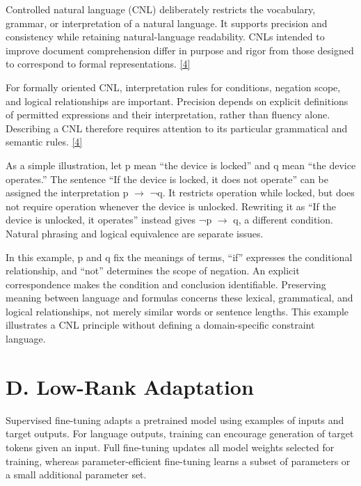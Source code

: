 \documentclass[11pt,a4paper]{article}
\begin{document}
Controlled natural language (CNL) deliberately restricts the vocabulary, grammar, or interpretation of a natural language. It supports precision and consistency while retaining natural-language readability. CNLs intended to improve document comprehension differ in purpose and rigor from those designed to correspond to formal representations. \href{\detokenize{https://aclanthology.org/J14-1005/}}{[4]}\par

For formally oriented CNL, interpretation rules for conditions, negation scope, and logical relationships are important. Precision depends on explicit definitions of permitted expressions and their interpretation, rather than fluency alone. Describing a CNL therefore requires attention to its particular grammatical and semantic rules. \href{\detokenize{https://aclanthology.org/J14-1005/}}{[4]}\par

As a simple illustration, let p mean “the device is locked” and q mean “the device operates.” The sentence “If the device is locked, it does not operate” can be assigned the interpretation p \ensuremath{\rightarrow} ¬q. It restricts operation while locked, but does not require operation whenever the device is unlocked. Rewriting it as “If the device is unlocked, it operates” instead gives ¬p \ensuremath{\rightarrow} q, a different condition. Natural phrasing and logical equivalence are separate issues.\par

In this example, p and q fix the meanings of terms, “if” expresses the conditional relationship, and “not” determines the scope of negation. An explicit correspondence makes the condition and conclusion identifiable. Preserving meaning between language and formulas concerns these lexical, grammatical, and logical relationships, not merely similar words or sentence lengths. This example illustrates a CNL principle without defining a domain-specific constraint language.\par

\section*{D. Low-Rank Adaptation}

Supervised fine-tuning adapts a pretrained model using examples of inputs and target outputs. For language outputs, training can encourage generation of target tokens given an input. Full fine-tuning updates all model weights selected for training, whereas parameter-efficient fine-tuning learns a subset of parameters or a small additional parameter set.\par
\end{document}
